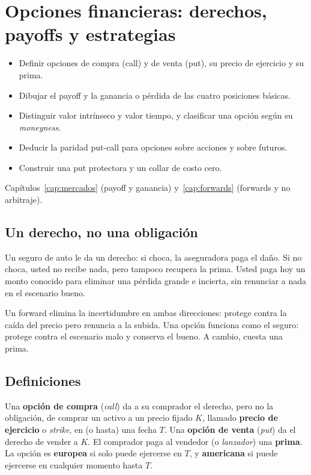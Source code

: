 \chapter{Opciones financieras: derechos, payoffs y estrategias}\label{cap:opciones}

\begin{objetivos}
\begin{itemize}
\item Definir opciones de compra (call) y de venta (put), su precio de ejercicio y su prima.
\item Dibujar el payoff y la ganancia o pérdida de las cuatro posiciones básicas.
\item Distinguir valor intrínseco y valor tiempo, y clasificar una opción según su \emph{moneyness}.
\item Deducir la paridad put-call para opciones sobre acciones y sobre futuros.
\item Construir una put protectora y un collar de costo cero.
\end{itemize}
\end{objetivos}

\begin{prerreq}Capítulos~\ref{cap:mercados} (payoff y ganancia) y~\ref{cap:forwards} (forwards y no arbitraje).\end{prerreq}

\section{Un derecho, no una obligación}

Un seguro de auto le da un derecho: si choca, la aseguradora paga el daño. Si no choca, usted no recibe nada, pero tampoco recupera la prima. Usted paga hoy un monto conocido para eliminar una pérdida grande e incierta, sin renunciar a nada en el escenario bueno.

Un forward elimina la incertidumbre en ambas direcciones: protege contra la caída del precio pero renuncia a la subida. Una opción funciona como el seguro: protege contra el escenario malo y conserva el bueno. A cambio, cuesta una prima.

\section{Definiciones}

\begin{definicion}[Opción]
Una \textbf{opción de compra} (\emph{call}) da a su comprador el derecho, pero no la obligación, de comprar un activo a un precio fijado $K$, llamado \textbf{precio de ejercicio} o \emph{strike}, en (o hasta) una fecha $T$. Una \textbf{opción de venta} (\emph{put}) da el derecho de vender a $K$. El comprador paga al vendedor (o \emph{lanzador}) una \textbf{prima}. La opción es \textbf{europea} si solo puede ejercerse en $T$, y \textbf{americana} si puede ejercerse en cualquier momento hasta $T$.
\end{definicion}

